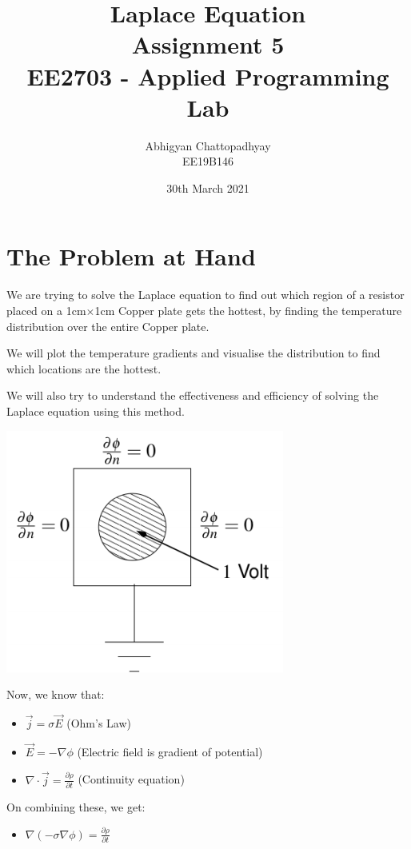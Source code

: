\documentclass[12pt]{article}
\title{\vspace{-1cm}Laplace Equation\\
\large Assignment 5\\
\large EE2703 - Applied Programming Lab}
\author{Abhigyan Chattopadhyay \\
EE19B146}
\date{30th March 2021}
\begin{document}
\maketitle
\tableofcontents
\pagebreak
\section{The Problem at Hand}
We are trying to solve the Laplace equation to find out which region of a resistor placed on a 1cm$\times$1cm Copper plate gets the hottest, by finding the temperature distribution over the entire Copper plate.

We will plot the temperature gradients and visualise the distribution to find which locations are the hottest.

We will also try to understand the effectiveness and efficiency of solving the Laplace equation using this method.
\begin{center}
\includegraphics{images/fig0.png}
\end{center}

Now, we know that:
\begin{itemize}
    \item $\vec{j} = \sigma \vec{E}$ (Ohm's Law)

    \item $\vec{E} = -\nabla \phi$ (Electric field is gradient of potential)

    \item $\nabla \cdot \vec{j} = \frac{\partial \rho}{\partial t}$ (Continuity equation)
\end{itemize}

On combining these, we get:

\begin{itemize}
    \item $\nabla (-\sigma \nabla \phi) = \frac{\partial \rho}{\partial t}$
\end{itemize}
\end{document}
